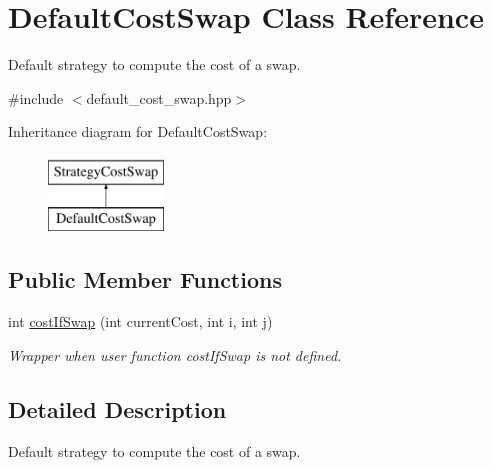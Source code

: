 \hypertarget{classDefaultCostSwap}{\section{\-Default\-Cost\-Swap \-Class \-Reference}
\label{classDefaultCostSwap}
}


\-Default strategy to compute the cost of a swap.  




{\ttfamily \#include $<$default\-\_\-cost\-\_\-swap.\-hpp$>$}

\-Inheritance diagram for \-Default\-Cost\-Swap\-:\begin{figure}[H]
\begin{center}
\leavevmode
\includegraphics[height=2.000000cm]{classDefaultCostSwap}
\end{center}
\end{figure}
\subsection*{\-Public \-Member \-Functions}
\begin{DoxyCompactItemize}
\item 
int \hyperlink{classDefaultCostSwap_a62c43925fb3f931b12f92d3a1bbfc55f}{cost\-If\-Swap} (int current\-Cost, int i, int j)
\begin{DoxyCompactList}\small\item\em \-Wrapper when user function cost\-If\-Swap is not defined. \end{DoxyCompactList}\end{DoxyCompactItemize}


\subsection{\-Detailed \-Description}
\-Default strategy to compute the cost of a swap. 

